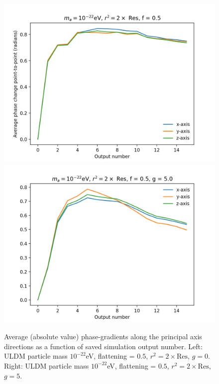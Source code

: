 \documentclass[a4paper,11pt]{article}
\begin{document}
\begin{figure}[!htb]
  \includegraphics[trim={1cm 0 1cm 0cm},scale=0.55]{R_2_f_0_5_phase_check.png}
\endminipage\hfill
{}
  \includegraphics[trim={0cm 0 1cm 0cm},scale=0.55]{R_2_rot_g_5_phase_check.png}
\endminipage\hfill
\caption{Average (absolute value) phase-gradients along the principal axis directions as a function of saved simulation output number. Left: ULDM particle mass $10^{-22}$eV, flattening = $0.5$, $r^2 = 2\times \mathrm{Res}$, $g = 0$. Right: ULDM particle mass $10^{-22}$eV, flattening = $0.5$, $r^2 = 2\times \mathrm{Res}$, $g = 5$.}
\label{fig:phase_check}
\end{figure}
\end{document}
